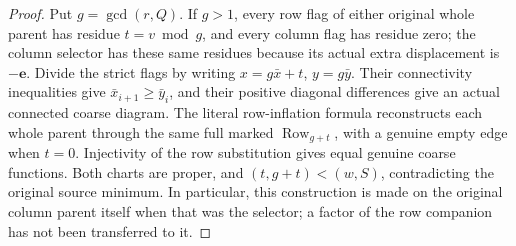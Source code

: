 \documentclass[11pt,a4paper]{amsart}
\numberwithin{equation}{section}
\theoremstyle{plain}
\theoremstyle{definition}
\newcommand{\Row}{\operatorname{Row}}
\begin{document}
\begin{proof}
Put \(g=\gcd(r,Q)\).  If \(g>1\), every row flag of either original
whole parent has residue \(t=v\bmod g\), and every column flag has
residue zero; the column selector has these same residues because its
actual extra displacement is \(-\mathbf e\).  Divide the strict flags
by writing \(x=g\bar x+t\), \(y=g\bar y\).
Their connectivity inequalities give \(\bar x_{i+1}\ge\bar y_i\),
and their positive diagonal differences give an actual connected coarse
diagram.  The literal row-inflation formula reconstructs each whole
parent through the same full marked \(\Row_{g+t}\), with a genuine
empty edge when \(t=0\).  Injectivity of the row substitution gives
equal genuine coarse functions.  Both charts are proper, and
\((t,g+t)<(w,S)\), contradicting the original source minimum.
In particular, this construction is made on the original column parent
itself when that was the selector; a factor of the row companion has
not been transferred to it.


\end{proof}
\end{document}
